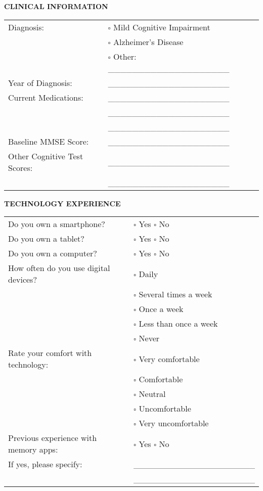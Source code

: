 \begin{tcolorbox}[title=Participant Demographics Form]
\vspace{0.5cm}

\textbf{CLINICAL INFORMATION}

\begin{tabular}{p{7cm}p{7cm}}
Diagnosis: & $\square$ Mild Cognitive Impairment \\
 & $\square$ Alzheimer's Disease \\
 & $\square$ Other: \_\_\_\_\_\_\_\_\_\_\_\_\_\_\_\_\_\_\_\_ \\[0.3cm]
Year of Diagnosis: & \_\_\_\_\_\_\_\_\_\_\_\_\_\_\_\_\_\_\_\_ \\[0.3cm]
Current Medications: & \_\_\_\_\_\_\_\_\_\_\_\_\_\_\_\_\_\_\_\_ \\
 & \_\_\_\_\_\_\_\_\_\_\_\_\_\_\_\_\_\_\_\_ \\
 & \_\_\_\_\_\_\_\_\_\_\_\_\_\_\_\_\_\_\_\_ \\[0.3cm]
Baseline MMSE Score: & \_\_\_\_\_\_\_\_\_\_\_\_\_\_\_\_\_\_\_\_ \\[0.3cm]
Other Cognitive Test Scores: & \_\_\_\_\_\_\_\_\_\_\_\_\_\_\_\_\_\_\_\_ \\
 & \_\_\_\_\_\_\_\_\_\_\_\_\_\_\_\_\_\_\_\_ \\[0.3cm]
\end{tabular}

\vspace{0.5cm}

\textbf{TECHNOLOGY EXPERIENCE}

\begin{tabular}{p{7cm}p{7cm}}
Do you own a smartphone? & $\square$ Yes \hspace{0.5cm} $\square$ No \\[0.3cm]
Do you own a tablet? & $\square$ Yes \hspace{0.5cm} $\square$ No \\[0.3cm]
Do you own a computer? & $\square$ Yes \hspace{0.5cm} $\square$ No \\[0.3cm]
How often do you use digital devices? & $\square$ Daily \\
 & $\square$ Several times a week \\
 & $\square$ Once a week \\
 & $\square$ Less than once a week \\
 & $\square$ Never \\[0.3cm]
Rate your comfort with technology: & $\square$ Very comfortable \\
 & $\square$ Comfortable \\
 & $\square$ Neutral \\
 & $\square$ Uncomfortable \\
 & $\square$ Very uncomfortable \\[0.3cm]
Previous experience with memory apps: & $\square$ Yes \hspace{0.5cm} $\square$ No \\
If yes, please specify: & \_\_\_\_\_\_\_\_\_\_\_\_\_\_\_\_\_\_\_\_ \\
 & \_\_\_\_\_\_\_\_\_\_\_\_\_\_\_\_\_\_\_\_ \\
\end{tabular}


\end{tcolorbox}
